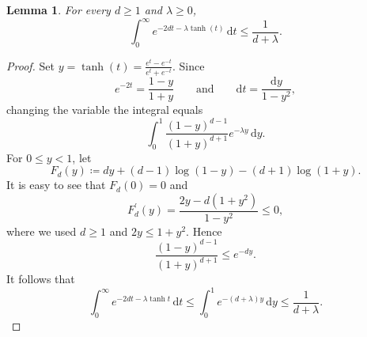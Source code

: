 \documentclass{amsbook}
\newtheorem{lemma}[theorem]{Lemma}
\theoremstyle{definition}
\theoremstyle{remark}
\numberwithin{section}{chapter}
\numberwithin{equation}{chapter}
\newcommand{\1}{\mathbf{1}}
\begin{document}
\begin{lemma}\label{tail-kernel-estimate}
For every $d\geq1$ and $\lambda\geq0$,
\[
\int_{0}^\infty e^{-2dt-\lambda\tanh(t)}\,\mathrm{d}t\leq \frac{1}{d+\lambda}.
\]
\end{lemma}

\begin{proof}
Set $y=\tanh(t)=\frac{e^{t}-e^{-t}}{e^{t}+e^{-t}}$.  Since
\[
e^{-2t}=\frac{1-y}{1+y}\qquad\text{and}\qquad \mathrm{d}t=\frac{\mathrm{d}y}{1-y^2},
\]
changing the variable the integral equals
\[
\int_{0}^{1}\frac{(1-y)^{d-1}}{(1+y)^{d+1}}e^{-\lambda y}\,\mathrm{d}y.
\]
For $0\leq y<1$, let
\[
F_d(y)\coloneqq dy+(d-1)\log(1-y)-(d+1)\log(1+y).
\]
It is easy to see that $F_d(0)=0$ and
\[
F_{d}^{\prime}(y)=\frac{2y-d(1+y^2)}{1-y^2}\leq0,
\]
where we used $d\geq1$ and $2y\leq1+y^2$.  Hence
\[
\frac{(1-y)^{d-1}}{(1+y)^{d+1}}\leq e^{-dy}.
\]
It follows that
\[
\int_0^\infty e^{-2dt-\lambda\tanh t}\,\mathrm{d}t \leq\int_0^1e^{-(d+\lambda)y}\,\mathrm{d}y \leq\frac{1}{d+\lambda}.
\]
\end{proof}
\end{document}
